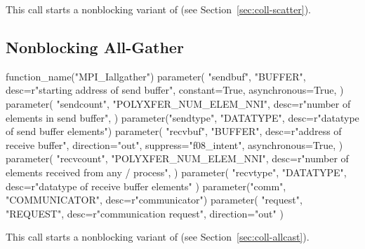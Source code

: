 This call starts a nonblocking variant of  (see
Section~\ref{sec:coll-scatter}).


\subsection{Nonblocking All-Gather}
\label{sec:nbcoll-iallcast}

\begin{mpi-binding}
    function_name("MPI_Iallgather")
    parameter(
        "sendbuf",
        "BUFFER",
        desc=r"starting address of send buffer",
        constant=True,
        asynchronous=True,
    )
    parameter(
        "sendcount",
        "POLYXFER_NUM_ELEM_NNI",
        desc=r"number of elements in send buffer",
    )
    parameter("sendtype", "DATATYPE", desc=r"datatype of send buffer elements")
    parameter(
        "recvbuf",
        "BUFFER",
        desc=r"address of receive buffer",
        direction="out",
        suppress="f08_intent",
        asynchronous=True,
    )
    parameter(
        "recvcount",
        "POLYXFER_NUM_ELEM_NNI",
        desc=r"number of elements received from any \MPI/ process",
    )
    parameter(
        "recvtype", "DATATYPE", desc=r"datatype of receive buffer elements"
    )
    parameter("comm", "COMMUNICATOR", desc=r"communicator")
    parameter(
        "request", "REQUEST", desc=r"communication request", direction="out"
    )
\end{mpi-binding}

This call starts a nonblocking variant of 
(see Section~\ref{sec:coll-allcast}).


